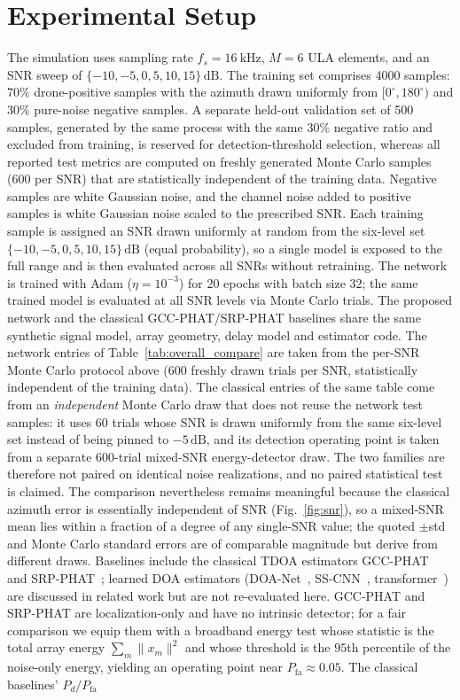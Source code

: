 \documentclass[sensors,article,submit,pdftex,moreauthors]{Definitions/mdpi}
\begin{document}
\section{Experimental Setup}
\label{sec:exp}
The simulation uses sampling rate $f_s=\SI{16}{\kilo\hertz}$, $M=6$ ULA elements, and an SNR sweep of $\{-10,-5,0,5,10,15\}\,\mathrm{dB}$. The training set comprises 4000 samples: $70\%$ drone-positive samples with the azimuth drawn uniformly from $[0^\circ,180^\circ)$ and $30\%$ pure-noise negative samples. A separate held-out validation set of 500 samples, generated by the same process with the same $30\%$ negative ratio and excluded from training, is reserved for detection-threshold selection, whereas all reported test metrics are computed on freshly generated Monte Carlo samples (600 per SNR) that are statistically independent of the training data. Negative samples are white Gaussian noise, and the channel noise added to positive samples is white Gaussian noise scaled to the prescribed SNR. Each training sample is assigned an SNR drawn uniformly at random from the six-level set $\{-10,-5,0,5,10,15\}\,\mathrm{dB}$ (equal probability), so a single model is exposed to the full range and is then evaluated across all SNRs without retraining. The network is trained with Adam ($\eta=10^{-3}$) for $20$ epochs with batch size $32$; the same trained model is evaluated at all SNR levels via Monte Carlo trials. The proposed network and the classical GCC-PHAT/SRP-PHAT baselines share the same synthetic signal model, array geometry, delay model and estimator code. The network entries of Table~\ref{tab:overall_compare} are taken from the per-SNR Monte Carlo protocol above (600 freshly drawn trials per SNR, statistically independent of the training data). The classical entries of the same table come from an \emph{independent} Monte Carlo draw that does not reuse the network test samples: it uses 60 trials whose SNR is drawn uniformly from the same six-level set instead of being pinned to $-5\,\mathrm{dB}$, and its detection operating point is taken from a separate 600-trial mixed-SNR energy-detector draw. The two families are therefore not paired on identical noise realizations, and no paired statistical test is claimed. The comparison nevertheless remains meaningful because the classical azimuth error is essentially independent of SNR (Fig.~\ref{fig:snr}), so a mixed-SNR mean lies within a fraction of a degree of any single-SNR value; the quoted $\pm$std and Monte Carlo standard errors are of comparable magnitude but derive from different draws. Baselines include the classical TDOA estimators GCC-PHAT~\cite{knapp1976gcc} and SRP-PHAT~\cite{dibiase2001srp}; learned DOA estimators (DOA-Net~\cite{adavanne2018doa}, SS-CNN~\cite{nguyen2020sscnn}, transformer~\cite{wang2024transformer,mack2022attention}) are discussed in related work but are not re-evaluated here. GCC-PHAT and SRP-PHAT are localization-only and have no intrinsic detector; for a fair comparison we equip them with a broadband energy test whose statistic is the total array energy $\sum_m\|x_m\|^2$ and whose threshold is the $95$th percentile of the noise-only energy, yielding an operating point near $P_{\mathrm{fa}}\approx0.05$. The classical baselines' $P_d/P_{\mathrm{fa}}$ 
\end{document}

